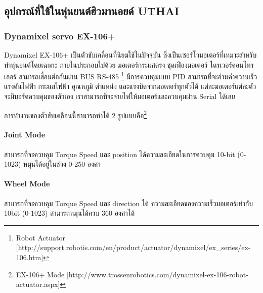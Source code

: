 \clearpage
\subsection{อุปกรณ์ที่ใช้ในหุ่นยนต์ฮิวมานอยด์ UTHAI}

\subsubsection*{Dynamixel servo EX-106+}
Dynamixel EX-106+ เป็นตัวขับเคลื่อนที่นิยมใช้ในปัจจุบัน ซึ่งเป็นเซอร์โวมอเตอร์ที่เหมาะสำหรับทำหุ่นยนต์โดยเฉพาะ
ภายในประกอบไปด้วย มอเตอร์กระแสตรง ชุดเฟืองมอเตอร์ ไดรเวอร์คอนโทรเลอร์ สามารถเชื่อมต่อกันผ่าน BUS RS-485
\footnote{ Robot Actuator [http://support.robotis.com/en/product/actuator/dynamixel/ex\_series/ex-106.htm] }
มีการควบคุมแบบ PID สามารถที่จะอ่านค่าความเร็ว
แรงดันไฟฟ้า กระแสไฟฟ้า อุณหภูมิ ตำแหน่ง และแรงบิดจากมอเตอร์ทุกตัวได้ แต่ละมอเตอร์แต่ละตัวจะมีบอร์ดควบคุมของตัวเอง
เราสามารถที่จะจ่ายไฟให้มอเตอร์และควบคุมผ่าน Serial ได้เลย

การทำงานของตัวขับเคลื่อนนี้สามารถทำได้ 2 รูปแบบคือ\footnote{ EX-106+ Mode [http://www.trossenrobotics.com/dynamixel-ex-106-robot-actuator.aspx] }

\paragraph*{Joint Mode}
สามารถที่จะควบคุม Torque Speed และ position ได้ความละเอียดในการควบคุม 10-bit (0-1023) หมุนได้อยู่ในช่วง 0-250 องศา

\paragraph*{Wheel Mode}
สามารถที่จะควบคุม Torque Speed และ direction ได้ ความละเอียดของความเร็วมอเตอร์เท่ากับ 10bit (0-1023) สามารถหมุนได้ครบ 360 องศาได้

